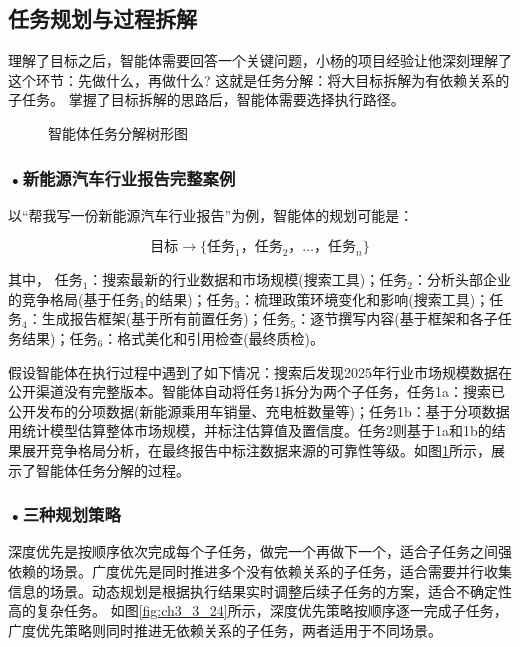 \subsection{任务规划与过程拆解}

理解了目标之后，智能体需要回答一个关键问题，小杨的项目经验让他深刻理解了这个环节：先做什么，再做什么?
这就是任务分解：将大目标拆解为有依赖关系的子任务。
掌握了目标拆解的思路后，智能体需要选择执行路径。

\begin{figure}[H]
\centering
{}
\caption{智能体任务分解树形图}
\label{fig:ch3_3_23}
\end{figure}


\subsubsection*{\textbf{•新能源汽车行业报告完整案例}}
以“帮我写一份新能源汽车行业报告”为例，智能体的规划可能是：

\[
\text{目标} \rightarrow \{\text{任务}_1， \text{任务}_2， \dots， \text{任务}_n\}
\]

其中，
任务\(_1\)：搜索最新的行业数据和市场规模(搜索工具)；任务\(_2\)：分析头部企业的竞争格局(基于任务\(_1\)的结果)；任务\(_3\)：梳理政策环境变化和影响(搜索工具)；任务\(_4\)：生成报告框架(基于所有前置任务)；任务\(_5\)：逐节撰写内容(基于框架和各子任务结果)；任务\(_6\)：格式美化和引用检查(最终质检)。

假设智能体在执行过程中遇到了如下情况：搜索后发现2025年行业市场规模数据在公开渠道没有完整版本。智能体自动将任务1拆分为两个子任务，任务1a：搜索已公开发布的分项数据(新能源乘用车销量、充电桩数量等)；任务1b：基于分项数据用统计模型估算整体市场规模，并标注估算值及置信度。任务2则基于1a和1b的结果展开竞争格局分析，在最终报告中标注数据来源的可靠性等级。如图\ref{fig:ch3_3_23}所示，展示了智能体任务分解的过程。


\subsubsection*{\textbf{•三种规划策略}}

深度优先是按顺序依次完成每个子任务，做完一个再做下一个，适合子任务之间强依赖的场景。广度优先是同时推进多个没有依赖关系的子任务，适合需要并行收集信息的场景。动态规划是根据执行结果实时调整后续子任务的方案，适合不确定性高的复杂任务。 如图\ref{fig:ch3_3_24}所示，深度优先策略按顺序逐一完成子任务，广度优先策略则同时推进无依赖关系的子任务，两者适用于不同场景。

